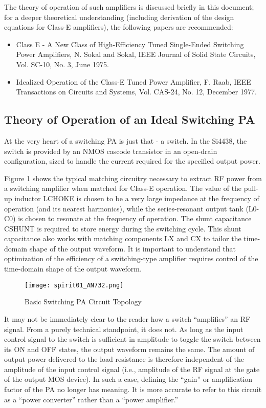     The theory of operation of such amplifiers is discussed briefly in this document; for a deeper 
    theoretical understanding (including derivation of the design equations for Class-E amplifiers), the 
    following papers are recommended:
    \begin{itemize}
      \item Class E - A New Class of High-Efficiency Tuned Single-Ended Switching Power Amplifiers, N. 
      Sokal and Sokal, IEEE Journal of Solid State Circuits, Vol. SC-10, No. 3, June 1975.
      \item Idealized Operation of the Class-E Tuned Power Amplifier, F. Raab, IEEE Transactions on 
      Circuits and Systems, Vol. CAS-24, No. 12, December 1977.
    \end{itemize}
  
    \subsection{Theory of Operation of an Ideal Switching PA}
      At the very heart of a switching PA is just that - a switch. In the Si4438, the switch is provided by 
      an NMOS cascode transistor in an open-drain configuration, sized to handle the current required for 
      the specified output power.

      Figure 1 shows the typical matching circuitry necessary to extract RF power from a switching 
      amplifier when matched for Class-E operation. The value of the pull-up inductor LCHOKE is chosen to 
      be a very large impedance at the frequency of operation (and its nearest harmonics), while the 
      series-resonant output tank (L0-C0) is chosen to resonate at the frequency of  operation. The shunt 
      capacitance CSHUNT is required to store energy during the switching cycle. This shunt capacitance 
      also works with matching components LX and CX to tailor the time-domain shape of the output waveform. 
      It is important to understand that optimization of the efficiency of a switching-type amplifier 
      requires control of the time-domain shape of the output waveform.

      \begin{figure}[ht!]  %
        \centering
        \texttt{[image: spirit01\_AN732.png]}
        \caption{Basic Switching PA Circuit Topology}
        \label{EXP001:fig_spirit01}
      \end{figure}        

      It may not be immediately clear to the reader how a switch “amplifies” an RF signal. From a purely 
      technical standpoint, it does not. As long as the input control signal to the switch is sufficient in 
      amplitude to toggle the switch between its ON and OFF states, the output waveform remains the same. 
      The amount of output power delivered to the load resistance is therefore independent of the amplitude 
      of the input control signal (i.e., amplitude of the RF signal at the gate of the output MOS device). 
      In such a case, defining the “gain” or amplification factor of the PA no longer has meaning. It is 
      more accurate to refer to this circuit as a “power converter” rather than a “power amplifier.”
      

